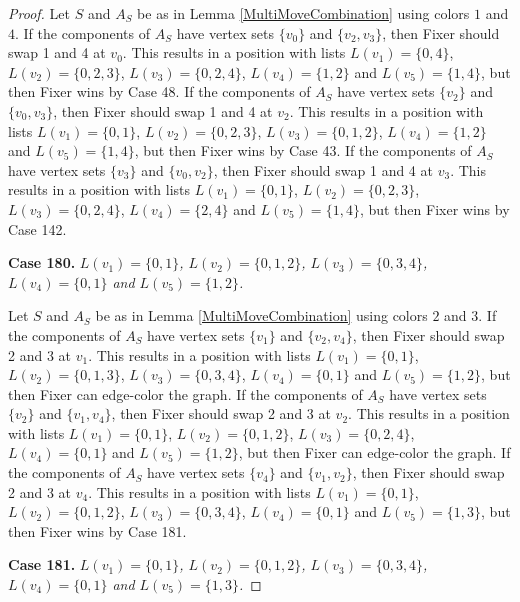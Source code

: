 \documentclass[12pt]{amsart}
\theoremstyle{plain}
\theoremstyle{definition}
\theoremstyle{remark}
\begin{document}
\begin{proof}
Let $S$ and $A_S$ be as in Lemma \ref{MultiMoveCombination} using colors $1$ and $4$. If the components of $A_S$ have vertex sets $\{v_0\}$ and $\{v_2, v_3\}$, then Fixer should swap 1 and 4 at $v_0$. This results in a position with lists $L(v_1) = \{0, 4\}$, $L(v_2) = \{0, 2, 3\}$, $L(v_3) = \{0, 2, 4\}$, $L(v_4) = \{1, 2\}$ and $L(v_5) = \{1, 4\}$, but then Fixer wins by Case 48.
If the components of $A_S$ have vertex sets $\{v_2\}$ and $\{v_0, v_3\}$, then Fixer should swap 1 and 4 at $v_2$. This results in a position with lists $L(v_1) = \{0, 1\}$, $L(v_2) = \{0, 2, 3\}$, $L(v_3) = \{0, 1, 2\}$, $L(v_4) = \{1, 2\}$ and $L(v_5) = \{1, 4\}$, but then Fixer wins by Case 43.
If the components of $A_S$ have vertex sets $\{v_3\}$ and $\{v_0, v_2\}$, then Fixer should swap 1 and 4 at $v_3$. This results in a position with lists $L(v_1) = \{0, 1\}$, $L(v_2) = \{0, 2, 3\}$, $L(v_3) = \{0, 2, 4\}$, $L(v_4) = \{2, 4\}$ and $L(v_5) = \{1, 4\}$, but then Fixer wins by Case 142.

\noindent\textbf{Case 180.  }\textit{$L(v_1) = \{0, 1\}$, $L(v_2) = \{0, 1, 2\}$, $L(v_3) = \{0, 3, 4\}$, $L(v_4) = \{0, 1\}$ and $L(v_5) = \{1, 2\}$.}

Let $S$ and $A_S$ be as in Lemma \ref{MultiMoveCombination} using colors $2$ and $3$. If the components of $A_S$ have vertex sets $\{v_1\}$ and $\{v_2, v_4\}$, then Fixer should swap 2 and 3 at $v_1$. This results in a position with lists $L(v_1) = \{0, 1\}$, $L(v_2) = \{0, 1, 3\}$, $L(v_3) = \{0, 3, 4\}$, $L(v_4) = \{0, 1\}$ and $L(v_5) = \{1, 2\}$, but then Fixer can edge-color the graph.
If the components of $A_S$ have vertex sets $\{v_2\}$ and $\{v_1, v_4\}$, then Fixer should swap 2 and 3 at $v_2$. This results in a position with lists $L(v_1) = \{0, 1\}$, $L(v_2) = \{0, 1, 2\}$, $L(v_3) = \{0, 2, 4\}$, $L(v_4) = \{0, 1\}$ and $L(v_5) = \{1, 2\}$, but then Fixer can edge-color the graph.
If the components of $A_S$ have vertex sets $\{v_4\}$ and $\{v_1, v_2\}$, then Fixer should swap 2 and 3 at $v_4$. This results in a position with lists $L(v_1) = \{0, 1\}$, $L(v_2) = \{0, 1, 2\}$, $L(v_3) = \{0, 3, 4\}$, $L(v_4) = \{0, 1\}$ and $L(v_5) = \{1, 3\}$, but then Fixer wins by Case 181.

\noindent\textbf{Case 181.  }\textit{$L(v_1) = \{0, 1\}$, $L(v_2) = \{0, 1, 2\}$, $L(v_3) = \{0, 3, 4\}$, $L(v_4) = \{0, 1\}$ and $L(v_5) = \{1, 3\}$.}


\end{proof}
\end{document}
